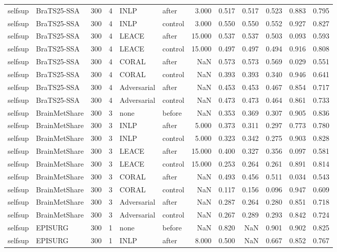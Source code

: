 \begin{tabular}{llrrllrrrrrr}
selfsup & BraTS25-SSA & 300 & 4 & INLP & after & 3.000 & 0.517 & 0.517 & 0.523 & 0.883 & 0.795 \\
selfsup & BraTS25-SSA & 300 & 4 & INLP & control & 3.000 & 0.550 & 0.550 & 0.552 & 0.927 & 0.827 \\
selfsup & BraTS25-SSA & 300 & 4 & LEACE & after & 15.000 & 0.537 & 0.537 & 0.503 & 0.093 & 0.593 \\
selfsup & BraTS25-SSA & 300 & 4 & LEACE & control & 15.000 & 0.497 & 0.497 & 0.494 & 0.916 & 0.808 \\
selfsup & BraTS25-SSA & 300 & 4 & CORAL & after & NaN & 0.573 & 0.573 & 0.569 & 0.029 & 0.551 \\
selfsup & BraTS25-SSA & 300 & 4 & CORAL & control & NaN & 0.393 & 0.393 & 0.340 & 0.946 & 0.641 \\
selfsup & BraTS25-SSA & 300 & 4 & Adversarial & after & NaN & 0.453 & 0.453 & 0.467 & 0.854 & 0.717 \\
selfsup & BraTS25-SSA & 300 & 4 & Adversarial & control & NaN & 0.473 & 0.473 & 0.464 & 0.861 & 0.733 \\
selfsup & BrainMetShare & 300 & 3 & none & before & NaN & 0.353 & 0.369 & 0.307 & 0.905 & 0.836 \\
selfsup & BrainMetShare & 300 & 3 & INLP & after & 5.000 & 0.373 & 0.311 & 0.297 & 0.773 & 0.780 \\
selfsup & BrainMetShare & 300 & 3 & INLP & control & 5.000 & 0.323 & 0.342 & 0.275 & 0.903 & 0.828 \\
selfsup & BrainMetShare & 300 & 3 & LEACE & after & 15.000 & 0.400 & 0.327 & 0.356 & 0.097 & 0.581 \\
selfsup & BrainMetShare & 300 & 3 & LEACE & control & 15.000 & 0.253 & 0.264 & 0.261 & 0.891 & 0.814 \\
selfsup & BrainMetShare & 300 & 3 & CORAL & after & NaN & 0.493 & 0.456 & 0.511 & 0.034 & 0.543 \\
selfsup & BrainMetShare & 300 & 3 & CORAL & control & NaN & 0.117 & 0.156 & 0.096 & 0.947 & 0.609 \\
selfsup & BrainMetShare & 300 & 3 & Adversarial & after & NaN & 0.287 & 0.264 & 0.280 & 0.851 & 0.718 \\
selfsup & BrainMetShare & 300 & 3 & Adversarial & control & NaN & 0.267 & 0.289 & 0.293 & 0.842 & 0.724 \\
selfsup & EPISURG & 300 & 1 & none & before & NaN & 0.820 & NaN & 0.901 & 0.902 & 0.825 \\
selfsup & EPISURG & 300 & 1 & INLP & after & 8.000 & 0.500 & NaN & 0.667 & 0.852 & 0.767 \\

\end{tabular}
